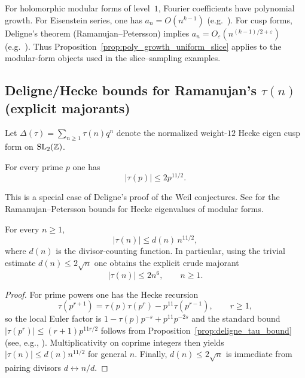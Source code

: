 \begin{remark}
For holomorphic modular forms of level~$1$, Fourier coefficients have polynomial growth. For Eisenstein series, one has $a_n=O(n^{k-1})$ (e.g.\ \cite{Apostol1990,DiamondShurman2005}). For cusp forms, Deligne's theorem (Ramanujan--Petersson) implies $a_n=O_\varepsilon(n^{(k-1)/2+\varepsilon})$ (e.g.\ \cite{Deligne1974,Serre1973}). Thus Proposition~\ref{prop:poly_growth_uniform_slice} applies to the modular-form objects used in the slice--sampling examples.
\end{remark}

\subsection{Deligne/Hecke bounds for Ramanujan's \texorpdfstring{$\tau(n)$}{tau(n)} (explicit majorants)}
\label{app:tau_bounds}

Let $\Delta(\tau)=\sum_{n\ge 1}\tau(n)q^n$ denote the normalized weight-$12$ Hecke eigen cusp form on $\mathrm{SL}_2(\mathbb{Z})$.

\begin{proposition}
\label{prop:deligne_tau_bound}
For every prime $p$ one has
\begin{equation}
|\tau(p)|\le 2p^{11/2}.
\end{equation}
\end{proposition}
\begin{remark}
This is a special case of Deligne's proof of the Weil conjectures. See \cite{Deligne1974,Deligne1971Bourbaki} for the Ramanujan--Petersson bounds for Hecke eigenvalues of modular forms.
\end{remark}

\begin{proposition}
\label{prop:tau_global_bound}
For every $n\ge 1$,
\begin{equation}
|\tau(n)|\le d(n)\,n^{11/2},
\end{equation}
where $d(n)$ is the divisor-counting function. In particular, using the trivial estimate $d(n)\le 2\sqrt{n}$ one obtains the explicit crude majorant
\begin{equation}
|\tau(n)|\le 2n^6,\qquad n\ge 1.
\end{equation}
\end{proposition}
\begin{proof}
For prime powers one has the Hecke recursion
\begin{equation}
\tau(p^{r+1})=\tau(p)\tau(p^r)-p^{11}\tau(p^{r-1}),\qquad r\ge 1,
\end{equation}
so the local Euler factor is $1-\tau(p)p^{-s}+p^{11}p^{-2s}$ and the standard bound $|\tau(p^r)|\le (r+1)p^{11r/2}$ follows from Proposition~\ref{prop:deligne_tau_bound} (see, e.g., \cite{Serre1973,DiamondShurman2005}).
Multiplicativity on coprime integers then yields $|\tau(n)|\le d(n)n^{11/2}$ for general $n$.
Finally, $d(n)\le 2\sqrt{n}$ is immediate from pairing divisors $d\leftrightarrow n/d$.
\end{proof}

